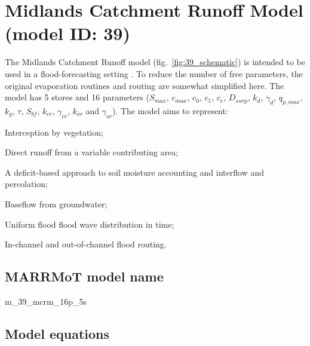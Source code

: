 \section{Midlands Catchment Runoff  Model (model ID: 39)}
The Midlands Catchment Runoff model (fig.~\ref{fig:39_schematic}) is intended to be used in a flood-forecasting setting \citep{Moore2001}. To reduce the number of free parameters, the original evaporation routines and routing are somewhat simplified here. The model has 5 stores and 16 parameters ($S_{max}$, $c_{max}$, $c_0$, $c_1$, $c_e$, $D_{surp}$, $k_d$, $\gamma_d$, $q_{p,max}$, $k_g$, $\tau$, $S_{bf}$, $k_{cr}$, $\gamma_{cr}$, $k_{or}$ and $\gamma_{or}$). The model aims to represent:

\begin{itemizecompact}
\item Interception by vegetation;
\item Direct runoff from a variable contributing area;
\item A deficit-based approach to soil moisture accounting and interflow and percolation;
\item Baseflow from groundwater;
\item Uniform flood flood wave distribution in time;
\item In-channel and out-of-channel flood routing.
\end{itemizecompact}

\subsection{MARRMoT model name}
m\_39\_mcrm\_16p\_5s \\

\subsection{Model equations}

